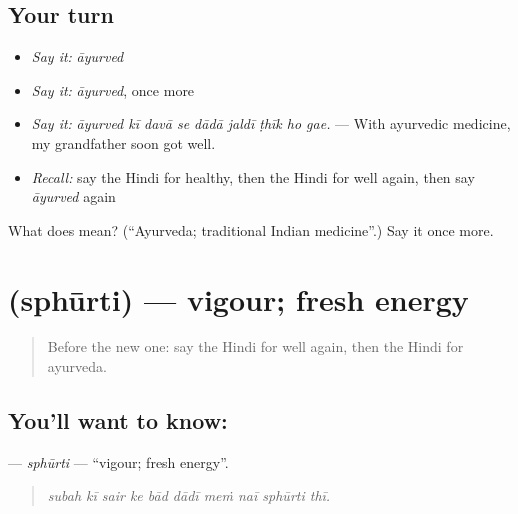 \subsection*{Your turn}
\begin{itemize}
\raggedright
  \item \emph{Say it:} \emph{āyurved}
  \item \emph{Say it:} \emph{āyurved}, once more
  \item \emph{Say it:} \emph{āyurved kī davā se dādā jaldī ṭhīk ho gae.} — With ayurvedic medicine, my grandfather soon got well.
  \item \emph{Recall:} say the Hindi for healthy, then the Hindi for well again, then say \emph{āyurved} again
\end{itemize}

\begin{tcolorbox}[breakable,colback=teal!4,colframe=teal!35!black,title={Before you move on}]
What does  mean? (\textquotedblleft{}Ayurveda; traditional Indian medicine\textquotedblright{}.) Say it once more.
\end{tcolorbox}
\section[\texorpdfstring{\hi{स्फूर्ति} (sphūrti)}{स्फूर्ति (sphūrti)}]{ (sphūrti) — vigour; fresh energy}

\label{lesson:HI-C492-sphurti}



\begin{quote}
Before the new one: say the Hindi for well again, then the Hindi for ayurveda.
\end{quote}

\subsection*{You'll want to know: }
\textbf{} — \emph{sphūrti} — \textquotedblleft{}vigour; fresh energy\textquotedblright{}.

\begin{quote}
         
\end{quote}

\begin{quote}
\emph{subah kī sair ke bād dādī meṁ naī sphūrti thī.}
\end{quote}

